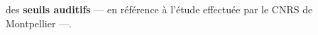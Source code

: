 des \textbf{seuils auditifs} --- en référence à
  l'étude effectuée par le CNRS de Montpellier\autocite{affectiveDisorders} ---.


